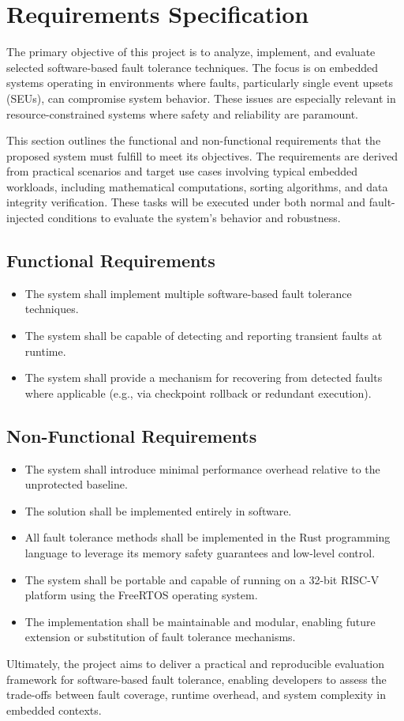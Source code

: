 \clearpage
\section{Requirements Specification}

The primary objective of this project is to analyze, implement, and evaluate selected software-based fault tolerance techniques. The focus is on embedded systems operating in environments where faults, particularly single event upsets (SEUs), can compromise system behavior. These issues are especially relevant in resource-constrained systems where safety and reliability are paramount.

This section outlines the functional and non-functional requirements that the proposed system must fulfill to meet its objectives. The requirements are derived from practical scenarios and target use cases involving typical embedded workloads, including mathematical computations, sorting algorithms, and data integrity verification. These tasks will be executed under both normal and fault-injected conditions to evaluate the system's behavior and robustness.

\subsection*{Functional Requirements}
\begin{itemize}
\item The system shall implement multiple software-based fault tolerance techniques.
\item The system shall be capable of detecting and reporting transient faults at runtime.
\item The system shall provide a mechanism for recovering from detected faults where applicable (e.g., via checkpoint rollback or redundant execution).
\end{itemize}

\subsection*{Non-Functional Requirements}
\begin{itemize}
\item The system shall introduce minimal performance overhead relative to the unprotected baseline.
\item The solution shall be implemented entirely in software.
\item All fault tolerance methods shall be implemented in the Rust programming language to leverage its memory safety guarantees and low-level control.
\item The system shall be portable and capable of running on a 32-bit RISC-V platform using the FreeRTOS operating system.
\item The implementation shall be maintainable and modular, enabling future extension or substitution of fault tolerance mechanisms.
\end{itemize}

Ultimately, the project aims to deliver a practical and reproducible evaluation framework for software-based fault tolerance, enabling developers to assess the trade-offs between fault coverage, runtime overhead, and system complexity in embedded contexts.